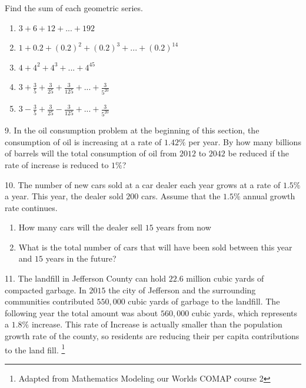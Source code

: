 \documentclass[10pt,]{book}
\theoremstyle{plain}
\theoremstyle{definition}
\theoremstyle{definition}
\theoremstyle{definition}
\numberwithin{equation}{section}
\begin{document}
\begin{exerciselist}
Find the sum of each geometric series.%
\leavevmode%
\begin{enumerate}[label=(\alph*)]
\item\hypertarget{li-82}{}\(3 + 6 + 12 + ... + 192\)%
\item\hypertarget{li-83}{}\(1 + 0.2 + (0.2)^2 + (0.2)^3 + ... + (0.2)^14\)%
\item\hypertarget{li-84}{}\(4 + 4^2 + 4^3 + ... + 4^45\)%
\item\hypertarget{li-85}{}\(3 + \frac{3}{5} + \frac{3}{25} + \frac{3}{125} + ... + \frac{3}{5^{20}}\)%
\item\hypertarget{li-86}{}\(3 - \frac{3}{5} + \frac{3}{25} - \frac{3}{125} + ... + \frac{3}{5^{20}}\)%
\end{enumerate}
\par\smallskip
\item[9.]\hypertarget{exercise-40}{}\hypertarget{p-181}{}%
In the oil consumption problem at the beginning of this section, the consumption of oil is increasing at a rate of \(1.42\%\) per year. By how many billions of barrels will the total consumption of oil from \(2012\) to \(2042\) be reduced if the rate of increase is reduced to \(1\%\)?%
\par\smallskip
\item[10.]\hypertarget{exercise-41}{}\hypertarget{p-182}{}%
The number of new cars sold at a car dealer each year grows at a rate of \(1.5\%\) a year. This year, the dealer sold \(200\) cars. Assume that the \(1.5\%\) annual growth rate continues.%
\leavevmode%
\begin{enumerate}[label=(\alph*)]
\item\hypertarget{li-87}{}How many cars will the dealer sell \(15\) years from now%
\item\hypertarget{li-88}{}What is the total number of cars that will have been sold between this year and \(15\) years in the future?%
\end{enumerate}
\par\smallskip
\item[11.]\hypertarget{exercise-42}{}\hypertarget{p-183}{}%
The landfill in Jefferson County can hold \(22.6\) million cubic yards of compacted garbage. In \(2015\) the city of Jefferson and the surrounding communities contributed \(550,000\) cubic yards of garbage to the landfill. The following year the total amount was about \(560,000\) cubic yards, which represents a \(1.8\%\) increase. This rate of Increase is actually smaller than the population growth rate of the county, so residents are reducing their per capita contributions to the land fill. \footnote{Adapted from Mathematics Modeling our Worlds COMAP course 2\label{fn-2}}%

\end{exerciselist}
\end{document}

